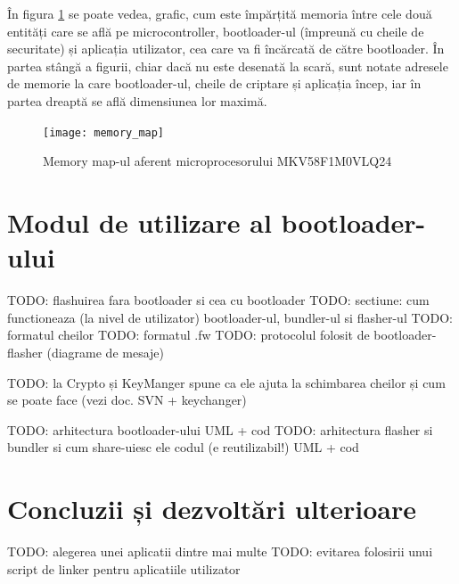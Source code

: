 \documentclass[12pt,a4paper,titlepage]{report}
\begin{document}
În figura \ref{memMap} se poate vedea, grafic, cum este împărțită memoria între cele două entități care se află pe microcontroller, bootloader-ul (împreună cu cheile de securitate) și aplicația utilizator, cea care va fi încărcată de către bootloader. În partea stângă a figurii, chiar dacă nu este desenată la scară, sunt notate adresele de memorie la care bootloader-ul, cheile de criptare și aplicația încep, iar în partea dreaptă se află dimensiunea lor maximă.

\begin{figure}[h]
    \centering
    \texttt{[image: memory\_map]}
    \caption{Memory map-ul aferent microprocesorului MKV58F1M0VLQ24}
    \label{memMap}
\end{figure}


\section{Modul de utilizare al bootloader-ului}
TODO: flashuirea fara bootloader si cea cu bootloader
TODO: sectiune: cum functioneaza (la nivel de utilizator) bootloader-ul, bundler-ul si flasher-ul
TODO: formatul cheilor
TODO: formatul .fw
TODO: protocolul folosit de bootloader-flasher (diagrame de mesaje)

TODO: la Crypto și KeyManger spune ca ele ajuta la schimbarea cheilor și cum se poate face (vezi doc. SVN + keychanger)

TODO: arhitectura bootloader-ului UML + cod
TODO: arhitectura flasher si bundler si cum share-uiesc ele codul (e reutilizabil!) UML + cod

\section{Concluzii și dezvoltări ulterioare}
TODO: alegerea unei aplicatii dintre mai multe
TODO: evitarea folosirii unui script de linker pentru aplicatiile utilizator

\newpage


\end{document}
